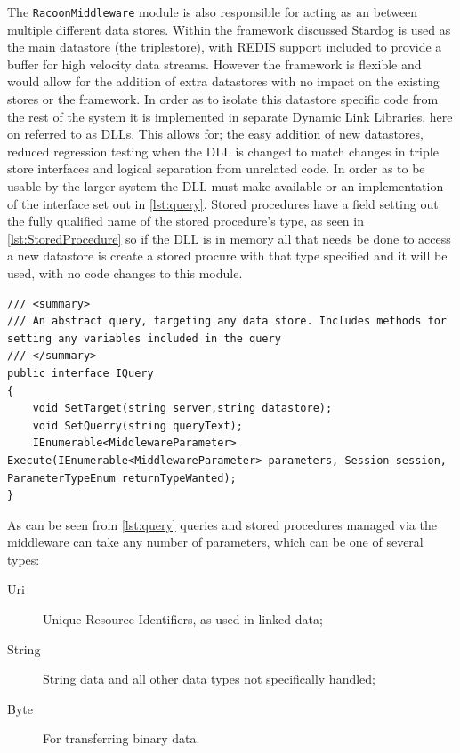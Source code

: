 The \texttt{RacoonMiddleware} module is also responsible for acting as an  between multiple different data stores. Within the framework discussed Stardog is used as the main datastore (the triplestore), with REDIS support included to provide a buffer for high velocity data streams. However the framework is flexible and would allow for the addition of extra datastores with no impact on the existing stores or the framework. In order as to isolate this datastore specific code from the rest of the system it is implemented in separate Dynamic Link Libraries, here on referred to as DLLs. This allows for; the easy addition of new datastores, reduced regression testing when the DLL is changed to match changes in triple store interfaces and logical separation from unrelated code. In order as to be usable by the larger system the DLL must make available or  an implementation of the interface set out in \autoref{lst:query}. Stored procedures have a field setting out the fully qualified name of the stored procedure's type, as seen in \autoref{lst:StoredProcedure} so if the DLL is in memory all that needs be done to access a new datastore is create a stored procure with that type specified and it will be used, with no code changes to this module. 

\vfill
\begin{lstlisting}[language={[Sharp]C},frame=tb,caption={The IQuery interface, which must be implemented by all executable queries},label=lst:query]
/// <summary>
/// An abstract query, targeting any data store. Includes methods for setting any variables included in the query
/// </summary>
public interface IQuery
{
    void SetTarget(string server,string datastore);
    void SetQuerry(string queryText);
    IEnumerable<MiddlewareParameter> Execute(IEnumerable<MiddlewareParameter> parameters, Session session, ParameterTypeEnum returnTypeWanted);      
}
\end{lstlisting}

As can be seen from \autoref{lst:query} queries and stored procedures managed via the middleware can take any number of parameters, which can be one of several types:

\begin{description}
    \item[Uri]  Unique Resource Identifiers, as used in linked data;
    \item[String] String data and all other data types not specifically handled;    
    \item[Byte] For transferring binary data.
\end{description}

